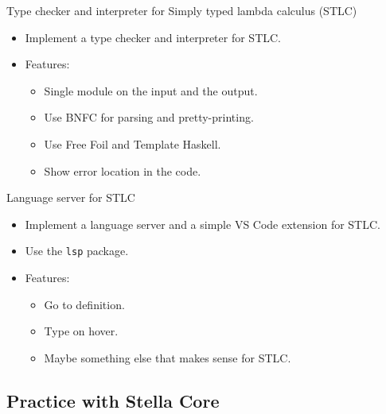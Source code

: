 \documentclass[serif, aspectratio=169]{beamer}
\begin{document}
\begin{frame}{Type checker and interpreter for Simply typed lambda calculus (STLC)}
    \begin{itemize}
        \item Implement a type checker and interpreter for STLC.
        \item Features:
              \begin{itemize}
                  \item Single module on the input and the output.
                  \item Use BNFC for parsing and pretty-printing.
                  \item Use Free Foil and Template Haskell.
                  \item Show error location in the code.
              \end{itemize}
    \end{itemize}

\end{frame}

\begin{frame}{Language server for STLC}
    \begin{itemize}
        \item Implement a language server and a simple VS Code extension for STLC.
        \item Use the \texttt{lsp} \cite{hackage_lsp} package.
        \item Features:
              \begin{itemize}
                  \item Go to definition.
                  \item Type on hover.
                  \item Maybe something else that makes sense for STLC.
              \end{itemize}
    \end{itemize}

\end{frame}

\subsection{Practice with Stella Core}
\end{document}
